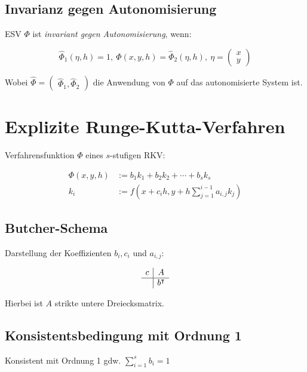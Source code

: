 \subsection*{Invarianz gegen Autonomisierung}

ESV $\Phi$ ist \emph{invariant gegen Autonomisierung}, wenn:

$$\widehat{\Phi}_1(\eta,h)=1, \ \Phi(x,y,h) = \widehat{\Phi}_2(\eta,h), \ \eta = \begin{pmatrix}x \\ y\end{pmatrix}$$

Wobei $\widehat{\Phi} = \begin{pmatrix}\widehat{\Phi}_1, \widehat{\Phi}_2\end{pmatrix}$ die Anwendung von $\Phi$ auf das autonomisierte System ist.

\section*{Explizite Runge-Kutta-Verfahren}

Verfahrensfunktion $\Phi$ eines $s$-stufigen RKV:

\vspace*{-4mm}
\begin{align*}
\Phi(x,y,h) &:= b_1 k_1 + b_2 k_2 + \cdots + b_s k_s \\
k_i &:= f(x+c_i h, y + h \sum_{j=1}^{i-1} a_{i,j} k_j)
\end{align*}
\vspace*{-8mm}

\subsection*{Butcher-Schema}

Darstellung der Koeffizienten $b_i, c_i$ und $a_{i,j}$:

$$\begin{array}{c|c}
c & A \\
\hline
  & b^\intercal
\end{array}$$

Hierbei ist $A$ strikte untere Dreiecksmatrix.

\subsection*{Konsistentsbedingung mit Ordnung 1}

Konsistent mit Ordnung 1 gdw. $\displaystyle\sum_{i=1}^s b_i = 1$

